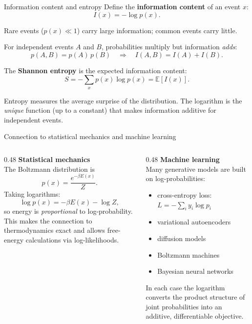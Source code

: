 \documentclass[aspectratio=169]{beamer}
\begin{document}

\begin{frame}{Information content and entropy}
Define the \textbf{information content} of an event \(x\):
\[
I(x)=-\log p(x).
\]

Rare events (\(p(x)\ll 1\)) carry large information;
common events carry little.

\medskip

For independent events \(A\) and \(B\), probabilities multiply
but information \emph{adds}:
\[
p(A,B)=p(A)\,p(B)
\quad\Longrightarrow\quad
I(A,B)=I(A)+I(B).
\]

The \textbf{Shannon entropy} is the expected information content:
\[
S=-\sum_x p(x)\log p(x)=\mathbb{E}[I(x)].
\]

Entropy measures the average surprise of the distribution.
The logarithm is the \emph{unique} function (up to a constant)
that makes information additive for independent events.
\end{frame}

\begin{frame}{Connection to statistical mechanics and machine learning}
\begin{columns}[T]
\begin{column}{0.48\textwidth}
\textbf{Statistical mechanics}\\[4pt]
The Boltzmann distribution is
\[
p(x)=\frac{e^{-\beta E(x)}}{Z}.
\]
Taking logarithms:
\[
\log p(x)=-\beta E(x)-\log Z,
\]
so energy is \emph{proportional} to log-probability.
This makes the connection to thermodynamics exact
and allows free-energy calculations via log-likelihoods.
\end{column}
\begin{column}{0.48\textwidth}
\textbf{Machine learning}\\[4pt]
Many generative models are built on log-probabilities:
\begin{itemize}
  \item cross-entropy loss:
        \(L=-\sum_i y_i\log p_i\)
  \item variational autoencoders
  \item diffusion models
  \item Boltzmann machines
  \item Bayesian neural networks
\end{itemize}
In each case the logarithm converts the product structure of
joint probabilities into an additive, differentiable objective.
\end{column}
\end{columns}
\end{frame}
\end{document}
